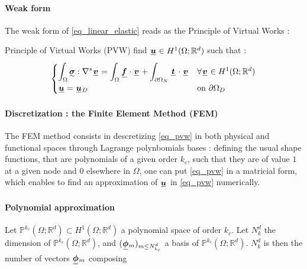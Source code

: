 \documentclass[fleqn]{article}
\newcommand{\Hone}{
  H^{1}(\Omega; \mathbb{R}^{d})
}
\begin{document}
    \paragraph{Weak form}

      The weak form of \eqref{eq_linear_elastic} reads as the Principle of Virtual Works :

      \begin{theorembox}{Principle of Virtual Works (PVW)}
        find $\tensori{u} \in \Hone$ such that : 
        \begin{equation}
          \begin{cases}
            \displaystyle
            \int_{\Omega} \tensorii{\sigma} : \nabla^s \tensori{v} = \int_{\Omega} \tensori{f} \cdot \tensori{v} + \int_{\partial \Omega_N} \tensori{t} \cdot \tensori{v} &  \forall \tensori{v} \in \Hone
            \\
            \tensori{u} = \tensori{u} \subscript{D} & \mbox{on } \partial \Omega_D
          \end{cases}
        \end{equation}
        \label{eq_pvw}
      \end{theorembox}

    \paragraph{Discretization : the Finite Element Method (FEM)}

      The FEM method consists in descretizing \eqref{eq_pvw} in both physical and functional spaces through Lagrange polynbomials bases : defining the usual shape functions, that are polynomials of a given order $k_c$, such that they are of value $1$ at a given node and $0$ elsewhere in $\Omega$, one can put \eqref{eq_pvw} in a matricial form, which enables to find an approximation of $\tensori{u}$ in \eqref{eq_pvw} numerically.
    
    \paragraph{Polynomial approximation}

      Let $\mathbb{P}^{k_c}(\Omega;\mathbb{R}^d) \subset \Hone$ a polynomial space of order $k_c$. Let $N_k^d$ the dimension of $\mathbb{P}^{k_c}(\Omega;\mathbb{R}^d)$, and $(\tensori{\phi}\subscript{m})_{m \leq N_{k_c}^d}$ a basis of $\mathbb{P}^{k_c}(\Omega;\mathbb{R}^d)$. $N_k^d$ is then the number of vectors $\tensori{\phi}\subscript{m}$ composing 
    
\end{document}
